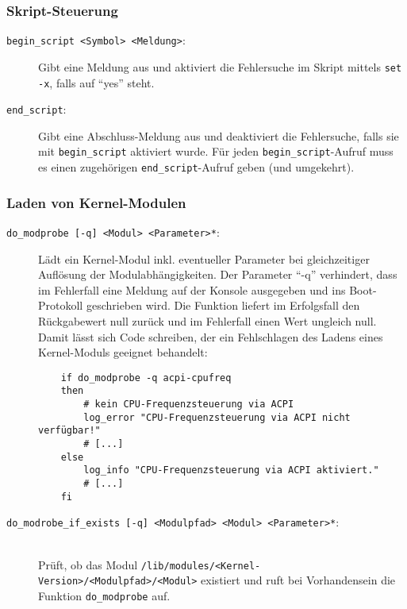 \subsubsection{Skript-Steuerung}

\begin{description}

\item[\texttt{begin\_script <Symbol> <Meldung>}:]
Gibt eine Meldung aus und aktiviert die Fehlersuche im Skript mittels
\texttt{set -x}, falls  auf "`yes"' steht.

\item[\texttt{end\_script}:]
Gibt eine Abschluss-Meldung aus und deaktiviert
die Fehlersuche, falls sie mit \texttt{begin\_script} aktiviert wurde. Für
jeden \texttt{begin\_script}-Aufruf muss es einen zugehörigen
\texttt{end\_script}-Aufruf geben (und umgekehrt).

\end{description}

\subsubsection{Laden von Kernel-Modulen}

\begin{description}

\item[\texttt{do\_modprobe [-q] <Modul> <Parameter>*}:]
Lädt ein Kernel-Modul inkl.
eventueller Parameter bei gleichzeitiger Auflösung der Modulabhängigkeiten.
Der Parameter "`-q"' verhindert, dass im Fehlerfall eine Meldung auf der Konsole
ausgegeben und ins Boot-Protokoll geschrieben wird.
Die Funktion liefert im Erfolgsfall den Rückgabewert null zurück und im
Fehlerfall einen Wert ungleich null. Damit lässt sich Code schreiben, der
ein Fehlschlagen des Ladens eines Kernel-Moduls geeignet behandelt:

\begin{example}
\begin{verbatim}
    if do_modprobe -q acpi-cpufreq
    then
        # kein CPU-Frequenzsteuerung via ACPI
        log_error "CPU-Frequenzsteuerung via ACPI nicht verfügbar!"
        # [...]
    else
        log_info "CPU-Frequenzsteuerung via ACPI aktiviert."
        # [...]
    fi
\end{verbatim}
\end{example}

\item[\texttt{do\_modrobe\_if\_exists [-q] <Modulpfad> <Modul> <Parameter>*}:]\mbox{}\\
Prüft, ob das Modul \texttt{/lib/modules/<Kernel-Version>/<Modulpfad>/<Modul>}
existiert und ruft bei Vorhandensein die Funktion \texttt{do\_modprobe} auf.


\end{description}

